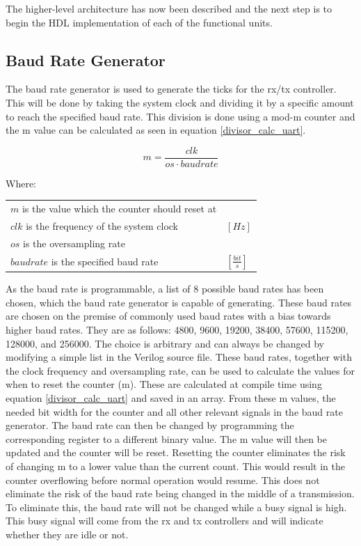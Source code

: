 \documentclass[./dissertation.tex]{subfiles}
\begin{document}
The higher-level architecture has now been described and the next step is to begin the HDL implementation of each of the functional units.

\subsection{Baud Rate Generator}
The baud rate generator is used to generate the ticks for the rx/tx controller. This will be done by taking the system clock and dividing it by a specific amount to reach the specified baud rate. This division is done using a mod-m counter and the m value can be calculated as seen in equation \ref{divisor_calc_uart}.

\begin{equation}
    \label{divisor_calc_uart}
    m = \frac{clk}{os \cdot baudrate}
\end{equation}

Where:
\begin{table}[H]
\begin{tabular}{ll}
$m$ is the value which the counter should reset at & \\
$clk$ is the frequency of the system clock & $[Hz]$\\
$os$ is the oversampling rate & \\
$baudrate$ is the specified baud rate & $[\frac{bit}{s}]$
\end{tabular}
\end{table}

As the baud rate is programmable, a list of 8 possible baud rates has been chosen, which the baud rate generator is capable of generating. These baud rates are chosen on the premise of commonly used baud rates with a bias towards higher baud rates. They are as follows: 4800, 9600, 19200, 38400, 57600, 115200, 128000, and 256000. The choice is arbitrary and can always be changed by modifying a simple list in the Verilog source file. These baud rates, together with the clock frequency and oversampling rate, can be used to calculate the values for when to reset the counter (m). These are calculated at compile time using equation \ref{divisor_calc_uart} and saved in an array. From these m values, the needed bit width for the counter and all other relevant signals in the baud rate generator. The baud rate can then be changed by programming the corresponding register to a different binary value. The m value will then be updated and the counter will be reset. Resetting the counter eliminates the risk of changing m to a lower value than the current count. This would result in the counter overflowing before normal operation would resume. This does not eliminate the risk of the baud rate being changed in the middle of a transmission. To eliminate this, the baud rate will not be changed while a busy signal is high. This busy signal will come from the rx and tx controllers and will indicate whether they are idle or not.
\end{document}
